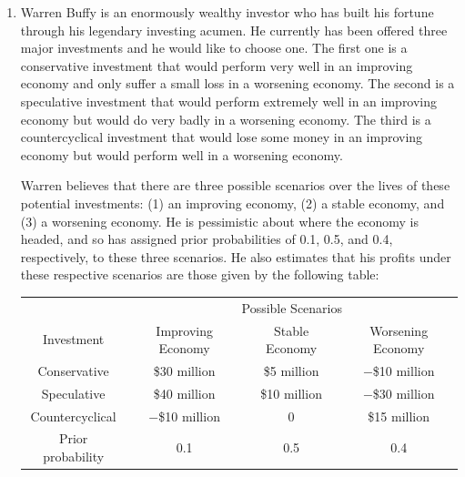 \documentclass[a4paper]{article}
\begin{document}
\courseheader
{}

\begin{enumerate}
  \setlength{\itemsep}{3\parskip}

  \item Warren Buffy is an enormously wealthy investor who has built his fortune through his legendary investing acumen. He currently has been offered three major investments and he would like to choose one. The first one is a conservative investment that would perform very well in an improving economy and only suffer a small loss in a worsening economy. The second is a speculative investment that would perform extremely well in an improving economy but would do very badly in a worsening economy. The third is a countercyclical investment that would lose some money in an improving economy but would perform well in a worsening economy.
  
\hspace*{4ex}Warren believes that there are three possible scenarios over the lives of these potential investments: (1) an improving economy, (2) a stable economy, and (3) a worsening economy. He is pessimistic about where the economy is headed, and so has assigned prior probabilities of 0.1, 0.5, and 0.4, respectively, to these three scenarios. He also estimates that his profits under these respective scenarios are those given by the following table:
  \begin{table}[h]
  	\centering
  	\begin{tabular}{cccc}
  		\toprule[1.5pt]
  		&\multicolumn{3}{c}{Possible Scenarios}\\
  		\cmidrule{2-4}
  		Investment&Improving Economy&Stable Economy&Worsening Economy\\
  		\midrule
		Conservative&\$30 million&\$5 million&$-$\$10 million\\
		Speculative&\$40 million&\$10 million&$-$\$30 million\\
		Countercyclical&$-$\$10 million&0&\$15 million\\
		\midrule
		Prior probability&0.1&0.5&0.4\\
  		\bottomrule[1.5pt]
  	\end{tabular}
  \end{table}
  

\end{enumerate}
\end{document}
